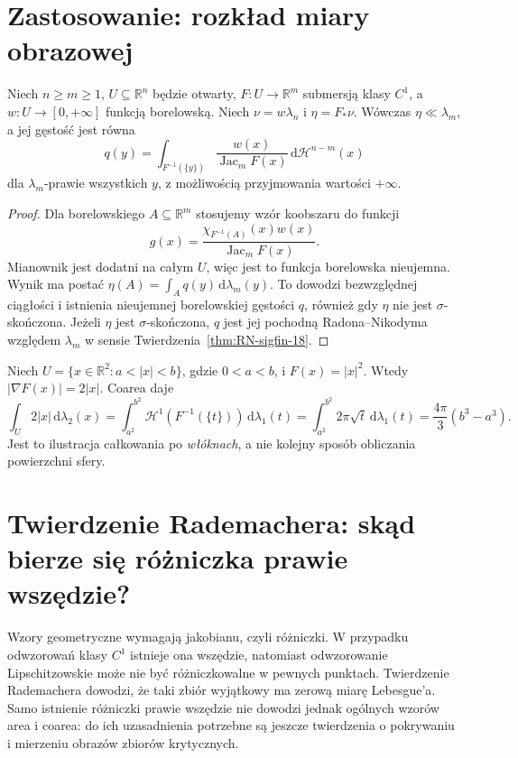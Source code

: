 \section{Zastosowanie: rozkład miary obrazowej}
\begin{twierdzenie}
\label{thm:pushforward-coarea-28}
Niech $n\ge m\ge1$, $U\subseteq\mathbb R^n$
będzie otwarty, $F:U\to\mathbb R^m$ submersją
klasy $C^1$, a $w:U\to[0,+\infty]$ funkcją
borelowską.
Niech $\nu=w\lambda_n$ i $\eta=F_*\nu$.
Wówczas $\eta\ll\lambda_m$, a jej gęstość jest
równa
\[
 q(y)=\int_{F^{-1}(\{y\})}
 \frac{w(x)}{\operatorname{Jac}_mF(x)}
 \,\mathrm d\mathcal H^{n-m}(x)
\]
dla $\lambda_m$-prawie wszystkich $y$,
z możliwością przyjmowania wartości $+\infty$.
\end{twierdzenie}
\begin{proof}
Dla borelowskiego $A\subseteq\mathbb R^m$
stosujemy wzór koobszaru do funkcji
\[
 g(x)=\frac{\chi_{F^{-1}(A)}(x)w(x)}
 {\operatorname{Jac}_mF(x)}.
\]
Mianownik jest dodatni na całym $U$, więc
jest to funkcja borelowska nieujemna.
Wynik ma postać
$\eta(A)=\int_A q(y)\,\mathrm d\lambda_m(y)$.
To dowodzi bezwzględnej ciągłości i istnienia
nieujemnej borelowskiej gęstości $q$, również gdy
$\eta$ nie jest $\sigma$-skończona. Jeżeli $\eta$
jest $\sigma$-skończona, $q$ jest jej pochodną
Radona--Nikodyma względem $\lambda_m$ w sensie
Twierdzenia~\ref{thm:RN-sigfin-18}.
\end{proof}

\begin{przyklad}
Niech $U=\{x\in\mathbb R^2:a<|x|<b\}$,
gdzie $0<a<b$, i $F(x)=|x|^2$.
Wtedy $|\nabla F(x)|=2|x|$. Coarea daje
\[
 \int_U 2|x|\,\mathrm d\lambda_2(x)
 =\int_{a^2}^{b^2}\mathcal H^1(F^{-1}(\{t\}))
 \,\mathrm d\lambda_1(t)
 =\int_{a^2}^{b^2}2\pi\sqrt t\,\mathrm d\lambda_1(t)
 =\frac{4\pi}{3}(b^3-a^3).
\]
Jest to ilustracja całkowania po \emph{włóknach},
a nie kolejny sposób obliczania powierzchni sfery.
\end{przyklad}


\section{Twierdzenie Rademachera: skąd bierze się różniczka prawie wszędzie?}
\label{sec:rademacher-28}

Wzory geometryczne wymagają jakobianu, czyli różniczki. W przypadku
odwzorowań klasy $C^1$ istnieje ona wszędzie, natomiast odwzorowanie
Lipschitzowskie może nie być różniczkowalne w pewnych punktach.
Twierdzenie Rademachera dowodzi, że taki zbiór wyjątkowy ma zerową
miarę Lebesgue'a. Samo istnienie różniczki prawie wszędzie nie dowodzi
jednak ogólnych wzorów area i coarea: do ich uzasadnienia potrzebne są
jeszcze twierdzenia o pokrywaniu i mierzeniu obrazów zbiorów krytycznych.

